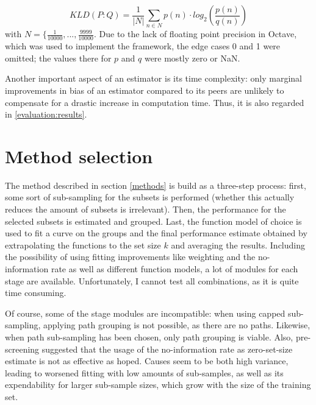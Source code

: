 \begin{equation}
KLD(P:Q) = \frac{1}{|N|} \sum_{n \in N}^{} p(n) \cdot log_2\left(\frac{p(n)}{q(n)}\right)
\end{equation}
with $N = \{\frac{1}{10000},...,\frac{9999}{10000}$. Due to the lack of floating point precision in Octave, which was used to implement the framework, the edge cases 0 and 1 were omitted; the values there for $p$ and $q$ were mostly zero or NaN.

Another important aspect of an estimator is its time complexity: only marginal improvements in bias of an estimator compared to its peers are unlikely to compensate for a drastic increase in computation time. Thus, it is also regarded in \ref{evaluation:results}.

\section{Method selection}

The method described in section \ref{methods} is build as a three-step process: first, some sort of sub-sampling for the subsets is performed (whether this actually reduces the amount of subsets is irrelevant). Then, the performance for the selected subsets is estimated and grouped. Last, the function model of choice is used to fit a curve on the groups and the final performance estimate obtained by extrapolating the functions to the set size $k$ and averaging the results. Including the possibility of using fitting improvements like weighting and the no-information rate as well as different function models, a lot of modules for each stage are available. Unfortunately, I cannot test all combinations, as it is quite time consuming.

Of course, some of the stage modules are incompatible: when using capped sub-sampling, applying path grouping is not possible, as there are no paths. Likewise, when path sub-sampling has been chosen, only path grouping is viable. Also, pre-screening suggested that the usage of the no-information rate as zero-set-size estimate is not as effective as hoped. Causes seem to be both high variance, leading to worsened fitting with low amounts of sub-samples, as well as its expendability for larger sub-sample sizes, which grow with the size of the training set.

